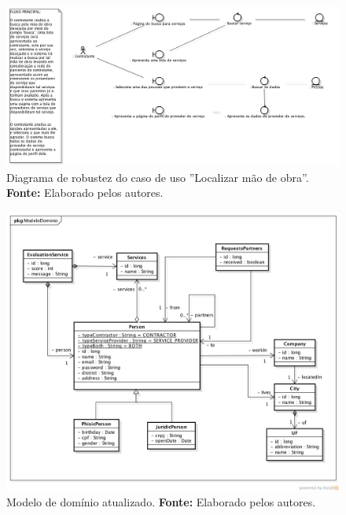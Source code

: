 \newpage
\begin{figure}[h!]
	\centerline{\includegraphics[scale=0.35]{./imagens/robustez.png}}
	\caption[Diagrama de robustez do caso de uso ''Localizar mão de obra'']
	{Diagrama de robustez do caso de uso ''Localizar mão de obra''. \textbf{Fonte:} Elaborado pelos autores.}
	\label{fig:diagrama_robustez_localizar_mao_de_obra}
\end{figure}

\begin{figure}[h!]
	\centerline{\includegraphics[scale=0.5]{./imagens/modelo-dominio-com-atributos.png}}
	\caption[Modelo de domínio atualizado]
	{Modelo de domínio atualizado. \textbf{Fonte:} Elaborado pelos autores.}
	\label{fig:modelo_dominio_atualizado}
\end{figure} 

\newpage

